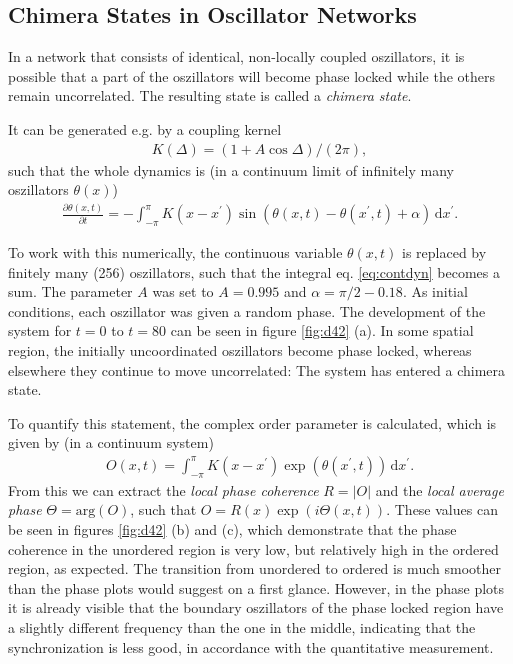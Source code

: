 \documentclass{scrartcl}
\begin{document}
\subsection{Chimera States in Oscillator Networks}
In a network that consists of identical, non-locally coupled oszillators, it is possible 
that a part of the oszillators will become phase locked while the others remain uncorrelated.
The resulting state is called a \emph{chimera state}.

It can be generated e.g. by a coupling kernel 
\begin{align}
K(\Delta) = (1 + A \cos{\Delta}) / (2 \pi),
\end{align}
such that the whole dynamics is (in a continuum limit of infinitely many oszillators $\theta(x)$)
\begin{align}
 \frac{\partial \theta(x, t)}{\partial t} = - \int_{-\pi}^{\pi} K(x-x^\prime) \sin \left( \theta(x, t) - \theta(x^\prime, t) + \alpha \right) \, \mathrm{d} x^\prime. \label{eq:contdyn}
\end{align}

To work with this numerically, the continuous variable $\theta(x, t)$ is replaced by finitely many (256) oszillators, such that the integral eq. \ref{eq:contdyn} becomes a sum. The parameter $A$ was set to $A= 0.995$ and $\alpha = \pi/2 - 0.18$. As initial conditions, each oszillator was given a random phase. 
The development of the system for $t=0$ to $t=80$ can be seen in figure \ref{fig:d42} (a).
In some spatial region, the initially uncoordinated oszillators become phase locked, whereas elsewhere they continue to move uncorrelated: The system has entered a chimera state.

To quantify this statement, the complex order parameter is calculated, which is given by (in a continuum system)
\begin{align}
 O(x, t) = \int_{-\pi}^{\pi} K(x-x^\prime) \exp( \theta(x^\prime, t)) \, \mathrm{d} x^\prime. \label{eq:orderparameter}
\end{align} 
From this we can extract the \emph{local phase coherence} $R = |O|$ and the \emph{local average phase} $\Theta = \mathrm{arg}(O)$, such that
$O = R(x) \exp( i \Theta(x, t) )$. 
These values can be seen in figures \ref{fig:d42} (b) and (c), which demonstrate that the phase coherence in the unordered region is very low, but relatively high in the ordered region, as expected. 
The transition from unordered to ordered is much smoother than the phase plots would suggest on a first glance.
However, in the phase plots it is already visible that the boundary oszillators of the phase locked region have a slightly different frequency than the one in the middle, indicating that the synchronization is less good, in accordance with the quantitative measurement.
\end{document}
